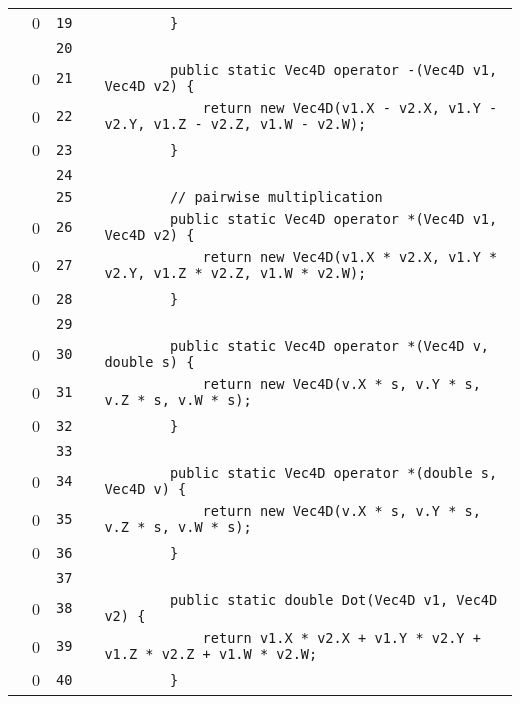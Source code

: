 \documentclass[a4paper,landscape,10pt]{article}
\begin{document}
\begin{longtable}[l]{lrrll}
\cellcolor{red} & 0 & \verb~19~ & & \verb~        }~\\
\cellcolor{gray} &  & \verb~20~ & & \verb~~\\
\cellcolor{red} & 0 & \verb~21~ & & \verb~        public static Vec4D operator -(Vec4D v1, Vec4D v2) {~\\
\cellcolor{red} & 0 & \verb~22~ & & \verb~            return new Vec4D(v1.X - v2.X, v1.Y - v2.Y, v1.Z - v2.Z, v1.W - v2.W);~\\
\cellcolor{red} & 0 & \verb~23~ & & \verb~        }~\\
\cellcolor{gray} &  & \verb~24~ & & \verb~~\\
\cellcolor{gray} &  & \verb~25~ & & \verb~        // pairwise multiplication~\\
\cellcolor{red} & 0 & \verb~26~ & & \verb~        public static Vec4D operator *(Vec4D v1, Vec4D v2) {~\\
\cellcolor{red} & 0 & \verb~27~ & & \verb~            return new Vec4D(v1.X * v2.X, v1.Y * v2.Y, v1.Z * v2.Z, v1.W * v2.W);~\\
\cellcolor{red} & 0 & \verb~28~ & & \verb~        }~\\
\cellcolor{gray} &  & \verb~29~ & & \verb~~\\
\cellcolor{red} & 0 & \verb~30~ & & \verb~        public static Vec4D operator *(Vec4D v, double s) {~\\
\cellcolor{red} & 0 & \verb~31~ & & \verb~            return new Vec4D(v.X * s, v.Y * s, v.Z * s, v.W * s);~\\
\cellcolor{red} & 0 & \verb~32~ & & \verb~        }~\\
\cellcolor{gray} &  & \verb~33~ & & \verb~~\\
\cellcolor{red} & 0 & \verb~34~ & & \verb~        public static Vec4D operator *(double s, Vec4D v) {~\\
\cellcolor{red} & 0 & \verb~35~ & & \verb~            return new Vec4D(v.X * s, v.Y * s, v.Z * s, v.W * s);~\\
\cellcolor{red} & 0 & \verb~36~ & & \verb~        }~\\
\cellcolor{gray} &  & \verb~37~ & & \verb~~\\
\cellcolor{red} & 0 & \verb~38~ & & \verb~        public static double Dot(Vec4D v1, Vec4D v2) {~\\
\cellcolor{red} & 0 & \verb~39~ & & \verb~            return v1.X * v2.X + v1.Y * v2.Y + v1.Z * v2.Z + v1.W * v2.W;~\\
\cellcolor{red} & 0 & \verb~40~ & & \verb~        }~\\

\end{longtable}
\end{document}

